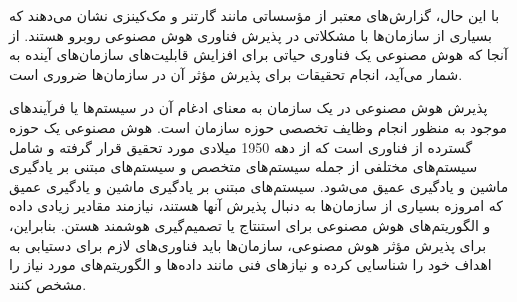 \documentclass[a4paper,10pt]{article}
\begin{document}
        با این حال، گزارش‌های معتبر از مؤسساتی مانند گارتنر و مک‌کینزی نشان می‌دهند که بسیاری از سازمان‌ها با مشکلاتی در پذیرش فناوری هوش مصنوعی روبرو هستند. از آنجا که هوش مصنوعی یک فناوری حیاتی برای افزایش قابلیت‌های سازمان‌های آینده به شمار می‌آید، انجام تحقیقات برای پذیرش مؤثر آن در سازمان‌ها ضروری است.

        پذیرش هوش مصنوعی در یک سازمان به معنای ادغام آن در سیستم‌ها یا فرآیندهای موجود به منظور انجام وظایف تخصصی حوزه سازمان است. هوش مصنوعی یک حوزه گسترده از فناوری است که از دهه 1950 میلادی مورد تحقیق قرار گرفته و شامل سیستم‌های مختلفی از جمله سیستم‌های متخصص و سیستم‌های مبتنی بر یادگیری ماشین و یادگیری عمیق می‌شود. سیستم‌های مبتنی بر یادگیری ماشین و یادگیری عمیق که امروزه بسیاری از سازمان‌ها به دنبال پذیرش آنها هستند، نیازمند مقادیر زیادی داده و الگوریتم‌های هوش مصنوعی برای استنتاج یا تصمیم‌گیری هوشمند هستن. بنابراین، برای پذیرش مؤثر هوش مصنوعی، سازمان‌ها باید فناوری‌های لازم برای دستیابی به اهداف خود را شناسایی کرده و نیازهای فنی مانند داده‌ها و الگوریتم‌های مورد نیاز را مشخص کنند.

        
\end{document}
